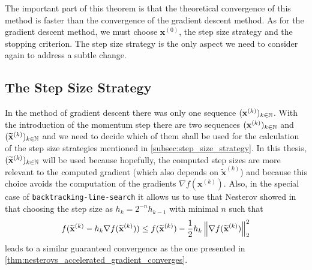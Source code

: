 The important part of this theorem is that the theoretical convergence of this method is faster than the convergence of the gradient descent method.
As for the gradient descent method, we must choose \(\mathbf{x}^{(0)}\), the step size strategy and the stopping criterion.
The step size strategy is the only aspect we need to consider again to address a subtle change.



\subsection{The Step Size Strategy} \label{subsec:NAG_step_size_strategy}

In the method of gradient descent there was only one sequence \((\mathbf{x}^{(k)})_{k \in \mathbb{N}}\).
With the introduction of the momentum step there are two sequences 
\((\mathbf{x}^{(k)})_{k \in \mathbb{N}}\) and \((\widetilde{\mathbf{x}}^{(k)})_{k \in \mathbb{N}}\)
and we need to decide which of them shall be used for the calculation of the step size strategies mentioned in \cref{subsec:step_size_strategy}.
In this thesis, \((\widetilde{\mathbf{x}}^{(k)})_{k \in \mathbb{N}}\)
will be used because hopefully, the computed step sizes are more relevant to the computed gradient (which also depends on \(\widetilde{\mathbf{x}}^{(k)}\))
and because this choice avoids the computation of the gradients \(\nabla f(\mathbf{x}^{(k)})\).
Also, in the special case of \texttt{backtracking-line-search} it allows us to use that Nesterov showed in \cite{Nesterov-NesterovAcceleratedGradient}
that choosing the step size as \(h_k = 2^{-n} h_{k-1}\) with minimal \(n\) such that 
\[f(\widetilde{\mathbf{x}}^{(k)} - h_k \nabla f(\widetilde{\mathbf{x}}^{(k)})) \leq f(\widetilde{\mathbf{x}}^{(k)}) - \frac{1}{2} h_k \left\lVert\nabla f(\widetilde{\mathbf{x}}^{(k)})\right\rVert_2^2 \]
leads to a similar guaranteed convergence as the one presented in \cref{thm:nesterovs_accelerated_gradient_converges}.

